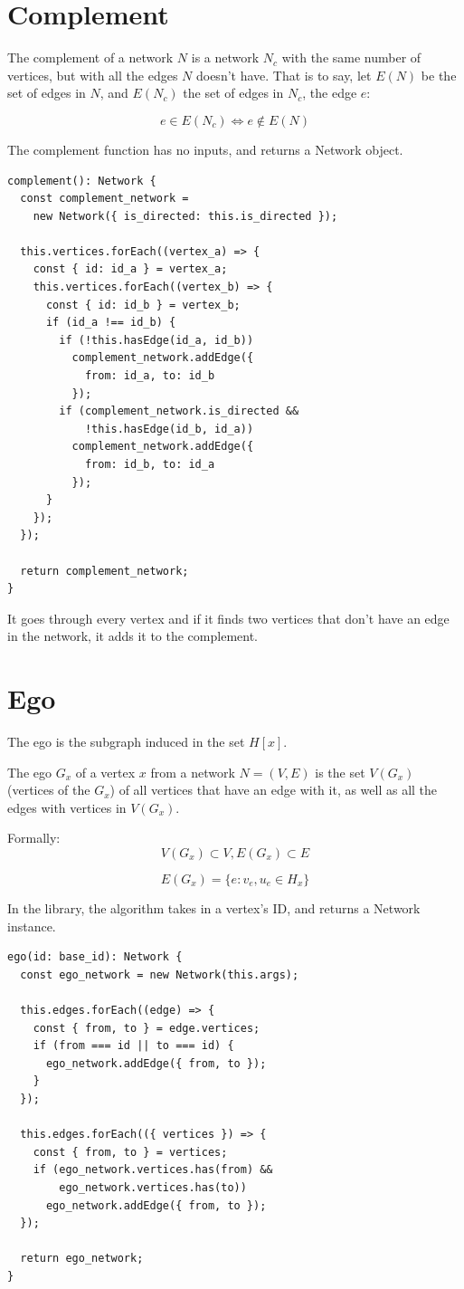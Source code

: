 \section{Complement}

The complement of a network $N$ is a network $N_c$ with the same number of vertices,
but with all the edges $N$ doesn't have.
That is to say, let $E(N)$ be the set of edges in $N$,
and $E(N_c)$ the set of edges in $N_c$, the edge $e$:

$$e\in E(N_c)\iff e \notin E(N)$$

The complement function has no inputs, and returns a Network object.
\begin{verbatim}
complement(): Network {
  const complement_network =
    new Network({ is_directed: this.is_directed });

  this.vertices.forEach((vertex_a) => {
    const { id: id_a } = vertex_a;
    this.vertices.forEach((vertex_b) => {
      const { id: id_b } = vertex_b;
      if (id_a !== id_b) {
        if (!this.hasEdge(id_a, id_b))
          complement_network.addEdge({
            from: id_a, to: id_b
          });
        if (complement_network.is_directed &&
            !this.hasEdge(id_b, id_a))
          complement_network.addEdge({
            from: id_b, to: id_a
          });
      }
    });
  });

  return complement_network;
}
\end{verbatim}

It goes through every vertex and if it finds two vertices that don't have an edge in the network,
it adds it to the complement.

\section{Ego}

The ego is the subgraph induced in the set $H[x]$.

The ego $G_x$ of a vertex $x$ from a network $N=(V,E)$ is the set $V(G_x)$ (vertices of the $G_x$)
of all vertices that have an edge with it, as well as all the edges with vertices in $V(G_x)$.

Formally:
$$V(G_x) \subset V, E(G_x) \subset E$$

$$E(G_x)=\{e : v_e,u_e \in H_x\}$$

In the library, the algorithm takes in a vertex's ID, and returns a Network instance.
\begin{verbatim}
ego(id: base_id): Network {
  const ego_network = new Network(this.args);

  this.edges.forEach((edge) => {
    const { from, to } = edge.vertices;
    if (from === id || to === id) {
      ego_network.addEdge({ from, to });
    }
  });

  this.edges.forEach(({ vertices }) => {
    const { from, to } = vertices;
    if (ego_network.vertices.has(from) &&
        ego_network.vertices.has(to))
      ego_network.addEdge({ from, to });
  });

  return ego_network;
}
\end{verbatim}


